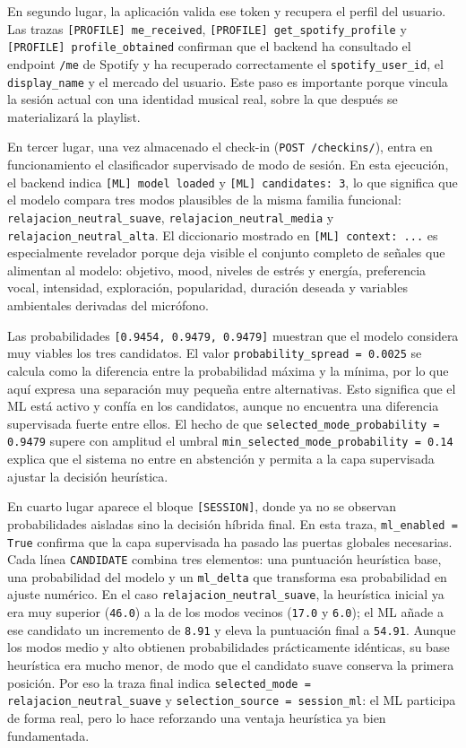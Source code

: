 En segundo lugar, la aplicación valida ese token y recupera el perfil del
usuario. Las trazas \texttt{[PROFILE] me\_received},
\texttt{[PROFILE] get\_spotify\_profile} y
\texttt{[PROFILE] profile\_obtained} confirman que el backend ha consultado el
endpoint \texttt{/me} de Spotify y ha recuperado correctamente el
\texttt{spotify\_user\_id}, el \texttt{display\_name} y el mercado del usuario.
Este paso es importante porque vincula la sesión actual con una identidad
musical real, sobre la que después se materializará la playlist.

En tercer lugar, una vez almacenado el check-in (\texttt{POST /checkins/}),
entra en funcionamiento el clasificador supervisado de modo de sesión. En esta
ejecución, el backend indica \texttt{[ML] model loaded} y
\texttt{[ML] candidates: 3}, lo que significa que el modelo compara tres
modos plausibles de la misma familia funcional:
\texttt{relajacion\_neutral\_suave},
\texttt{relajacion\_neutral\_media} y
\texttt{relajacion\_neutral\_alta}. El diccionario mostrado en
\texttt{[ML] context: ...} es especialmente revelador porque deja visible el
conjunto completo de señales que alimentan al modelo: objetivo, mood, niveles
de estrés y energía, preferencia vocal, intensidad, exploración, popularidad,
duración deseada y variables ambientales derivadas del micrófono.

Las probabilidades \texttt{[0.9454, 0.9479, 0.9479]} muestran que el modelo
considera muy viables los tres candidatos. El valor
\texttt{probability\_spread = 0.0025} se calcula como la diferencia entre la
probabilidad máxima y la mínima, por lo que aquí expresa una separación muy
pequeña entre alternativas. Esto significa que el ML está activo y confía en
los candidatos, aunque no encuentra una diferencia supervisada fuerte entre
ellos. El hecho de que \texttt{selected\_mode\_probability = 0.9479} supere
con amplitud el umbral \texttt{min\_selected\_mode\_probability = 0.14}
explica que el sistema no entre en abstención y permita a la capa supervisada
ajustar la decisión heurística.

En cuarto lugar aparece el bloque \texttt{[SESSION]}, donde ya no se observan
probabilidades aisladas sino la decisión híbrida final. En esta traza,
\texttt{ml\_enabled = True} confirma que la capa supervisada ha pasado las
puertas globales necesarias. Cada línea \texttt{CANDIDATE} combina tres
elementos: una puntuación heurística base, una probabilidad del modelo y un
\texttt{ml\_delta} que transforma esa probabilidad en ajuste numérico. En el
caso \texttt{relajacion\_neutral\_suave}, la heurística inicial ya era muy
superior (\texttt{46.0}) a la de los modos vecinos (\texttt{17.0} y
\texttt{6.0}); el ML añade a ese candidato un incremento de \texttt{8.91} y
eleva la puntuación final a \texttt{54.91}. Aunque los modos medio y alto
obtienen probabilidades prácticamente idénticas, su base heurística era mucho
menor, de modo que el candidato suave conserva la primera posición. Por eso la
traza final indica \texttt{selected\_mode = relajacion\_neutral\_suave} y
\texttt{selection\_source = session\_ml}: el ML participa de forma real, pero
lo hace reforzando una ventaja heurística ya bien fundamentada.

